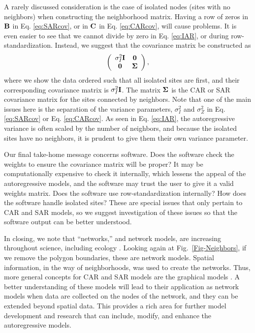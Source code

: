 \documentclass[11pt, titlepage]{article}\usepackage[]{graphicx}\usepackage[]{color}
\begin{document}
\begin{spacing}{1.9}
\begin{flushleft}
A rarely discussed consideration is the case of isolated nodes (sites with no neighbors) when constructing the neighborhood matrix.  Having a row of zeros in $\mathbf{B}$ in Eq. \ref{eq:SARcov}, or in $\mathbf{C}$ in Eq. \ref{eq:CARcov}, will cause problems.  It is even easier to see that we cannot divide by zero in Eq. \ref{eq:IAR}, or during row-standardization.  Instead, we suggest that the covariance matrix be constructed as
\[
	\left(
	\begin{array}{cc}
			\sigma^2_I \mathbf{I} & \mathbf{0} \\
					\mathbf{0} & \mbox{\boldmath $\Sigma$}
	\end{array}
	\right),
\]
where we show the data ordered such that all isolated sites are first, and their corresponding covariance matrix is $\sigma^2_I\mathbf{I}$.  The matrix $\mbox{\boldmath $\Sigma$}$ is the CAR or SAR covariance matrix for the sites connected by neighbors.  Note that one of the main issues here is the separation of the variance parameters, $\sigma^2_I$ and $\sigma^2_Z$ in Eq. \ref{eq:SARcov} or Eq. \ref{eq:CARcov}.  As seen in Eq. \ref{eq:IAR}, the autoregressive variance is often scaled by the number of neighbors, and because the isolated sites have no neighbors, it is prudent to give them their own variance parameter. 

Our final take-home message concerns software. Does the software check the weights to ensure the covariance matrix will be proper?  It may be computationally expensive to check it internally, which lessens the appeal of the autoregressive models, and the software may trust the user to give it a valid weights matrix. Does the software use row-standardization internally?  How does the software handle isolated sites?  These are special issues that only pertain to CAR and SAR models, so we suggest investigation of these issues so that the software output can be better understood.

In closing, we note that ``networks,'' and network models, are increasing throughout science, including ecology \citep{Borr:Mood:Edel:rise:2014}.  Looking again at Fig.~\ref{Fig-Neighbors}, if we remove the polygon boundaries, these are network models.  Spatial information, in the way of neighborhoods, was used to create the networks.  Thus, more general concepts for CAR and SAR models are the graphical models \citep{Laur:grap:1996, Whit:grap:2009}.  A better understanding of these models will lead to their application as network models when data are collected on the nodes of the network, and they can be extended beyond spatial data. This provides a rich area for further model development and research that can include, modify, and enhance the autoregressive models.


\end{flushleft}
\end{spacing}
\end{document}
